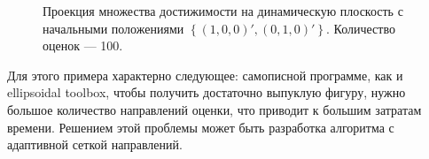 \documentclass[10pt, a4paper]{article}
\begin{document}
\begin{figure}[H]
\caption{Проекция множества достижимости на динамическую плоскость с начальными положениями $\left\{(1,0,0)',(0,1,0)'\right\}$. Количество оценок --- 100.}
\end{figure}

Для этого примера характерно следующее: самописной программе, как и ellipsoidal toolbox, чтобы получить достаточно выпуклую фигуру, нужно большое количество направлений оценки, что приводит к большим затратам времени. Решением этой проблемы может быть разработка алгоритма с адаптивной сеткой направлений.
\end{document}
